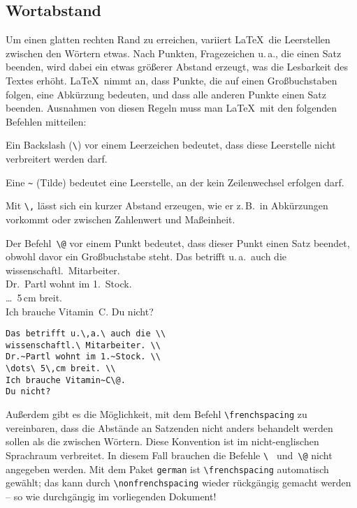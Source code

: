 \subsection{Wortabstand} \label{abstaende}
 
Um einen glatten rechten Rand zu erreichen, variiert \LaTeX\ die
Leerstellen zwischen den Wörtern etwas.
Nach Punkten, Fragezeichen u.\,a., die einen Satz beenden, wird
dabei ein etwas größerer Abstand erzeugt, was die Lesbarkeit
des Textes erhöht.
\LaTeX\ nimmt an, dass Punkte, die auf einen Großbuchstaben
folgen, eine Abkürzung bedeuten, und dass alle anderen Punkte
einen Satz beenden.
Ausnahmen von diesen Regeln muss man \LaTeX\ mit den folgenden
Befehlen mitteilen:

Ein Backslash (\verb:\:) vor einem Leerzeichen bedeutet, dass diese
Leerstelle nicht verbreitert werden darf.

Eine \verb|~| (Tilde) bedeutet eine Leerstelle,
an der kein Zeilenwechsel erfolgen darf.

Mit \verb|\,| lässt sich ein kurzer Abstand erzeugen, wie er
z.\,B.\ in Abkürzungen vorkommt oder zwischen Zahlenwert und Maßeinheit.

Der Befehl~\verb|\@| vor einem Punkt bedeutet, dass dieser Punkt
einen Satz beendet, obwohl davor ein Großbuchstabe steht.
\exa
Das betrifft u.\,a.\ auch die \\
wissenschaftl.\ Mitarbeiter. \\
Dr.~Partl wohnt im 1.~Stock. \\
\dots\ 5\,cm breit. \\
Ich brauche Vitamin~C\@. Du nicht?
\exb
\begin{verbatim}
Das betrifft u.\,a.\ auch die \\
wissenschaftl.\ Mitarbeiter. \\
Dr.~Partl wohnt im 1.~Stock. \\
\dots\ 5\,cm breit. \\
Ich brauche Vitamin~C\@.
Du nicht?
\end{verbatim}
\exc
 
Außerdem gibt es die Möglichkeit, mit dem Befehl
\verb|\frenchspacing|
zu vereinbaren, dass die Abstände an Satzenden nicht anders
behandelt werden sollen als die zwischen Wörtern.
Diese Konvention ist im nicht-englischen Sprachraum verbreitet.
In diesem Fall brauchen die Befehle \verb|\ | und~\verb|\@| nicht
angegeben werden.
Mit dem Paket \texttt{german}  ist \verb:\frenchspacing:
automatisch gewählt; das kann durch
\verb:\nonfrenchspacing:
wieder rückgängig gemacht werden -- so wie durchgängig im vorliegenden
Dokument!

